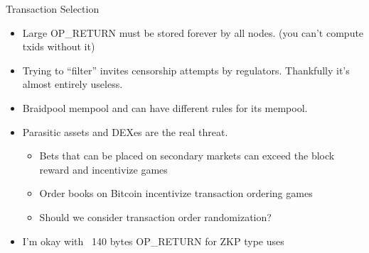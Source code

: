 \documentclass[tikz,mathserif,usenames,dvipsnames,svgnames,table]{beamer}
\newlength{\wideitemsep}
\let\olditem\item
\renewcommand{\item}{\setlength{\itemsep}{\wideitemsep}\olditem}
\begin{document}
\begin{frame}{Transaction Selection}
    \begin{itemize}
        \item Large OP\_RETURN must be stored forever by all nodes. (you can't
            compute txids without it)
        \item Trying to ``filter'' invites censorship attempts by regulators.
            Thankfully it's almost entirely useless.
        \item Braidpool mempool and can have different rules for its mempool.
        \item Parasitic assets and DEXes are the real threat.
            \begin{itemize}
                \item[$\Rightarrow$] Bets that can be placed on secondary
                    markets can exceed the block reward and incentivize games
                \item[$\Rightarrow$] Order books on Bitcoin incentivize
                    transaction ordering games
                \item[$\Rightarrow$] Should we consider transaction order randomization?
            \end{itemize}
        \item I'm okay with ~140 bytes OP\_RETURN for ZKP type uses
    \end{itemize}





\end{frame}
\end{document}
